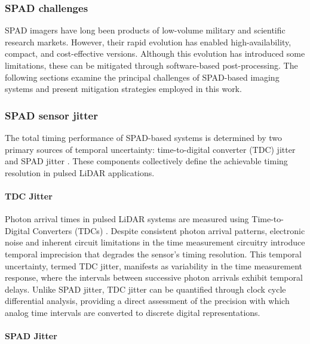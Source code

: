 \documentclass[12pt,a4paper,oneside]{report}
\begin{document}
\subsubsection{SPAD challenges}
\label{par:spad_challenges}

SPAD imagers have long been products of low-volume military and scientific research markets. However, their rapid evolution \cite{tachella2019,jungerman2022} has enabled high-availability, compact, and cost-effective versions. Although this evolution has introduced some limitations, these can be mitigated through software-based post-processing. The following sections examine the principal challenges of SPAD-based imaging systems and present mitigation strategies employed in this work.

\subsubsection{SPAD sensor jitter}
\label{par:spad_sensor_jitter}

The total timing performance of SPAD-based systems is determined by two primary sources of temporal uncertainty: time-to-digital converter (TDC) jitter and SPAD jitter \cite{itzler2011}. These components collectively define the achievable timing resolution in pulsed LiDAR applications.

\paragraph{TDC Jitter}
\label{par:tdc_jitter}

Photon arrival times in pulsed LiDAR systems are measured using Time-to-Digital Converters (TDCs) \cite{sesta2023}. Despite consistent photon arrival patterns, electronic noise and inherent circuit limitations in the time measurement circuitry introduce temporal imprecision that degrades the sensor's timing resolution. This temporal uncertainty, termed TDC jitter, manifests as variability in the time measurement response, where the intervals between successive photon arrivals exhibit temporal delays. Unlike SPAD jitter, TDC jitter can be quantified through clock cycle differential analysis, providing a direct assessment of the precision with which analog time intervals are converted to discrete digital representations.

\paragraph{SPAD Jitter}
\label{par:spad_jitter}
\end{document}
